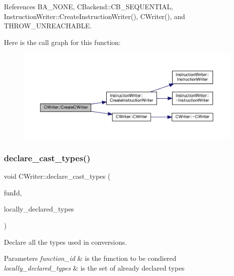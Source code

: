 References B\+A\+\_\+\+N\+O\+NE, C\+Backend\+::\+C\+B\+\_\+\+S\+E\+Q\+U\+E\+N\+T\+I\+AL, Instruction\+Writer\+::\+Create\+Instruction\+Writer(), C\+Writer(), and T\+H\+R\+O\+W\+\_\+\+U\+N\+R\+E\+A\+C\+H\+A\+B\+LE.

Here is the call graph for this function\+:
\nopagebreak
\begin{figure}[H]
\begin{center}
\leavevmode
\includegraphics[width=350pt]{d3/d59/classCWriter_ac5dc8feea1af06fe1d58f10fbe91eaf2_cgraph}
\end{center}
\end{figure}
\mbox{\label{classCWriter_abe7dc69f7739cf009bd2e943a60d1920}} 
\subsubsection{\texorpdfstring{declare\+\_\+cast\+\_\+types()}{declare\_cast\_types()}}
{\footnotesize\ttfamily void C\+Writer\+::declare\+\_\+cast\+\_\+types (\begin{DoxyParamCaption}\item[{unsigned int}]{fun\+Id,  }\item[{\hyperlink{custom__set_8hpp_a615bc2f42fc38a4bb1790d12c759e86f}{Custom\+Set}$<$ std\+::string $>$ \&}]{locally\+\_\+declared\+\_\+types }\end{DoxyParamCaption})\hspace{0.3cm}{\ttfamily [virtual]}}



Declare all the types used in conversions. 


\begin{DoxyParams}{Parameters}
{\em function\+\_\+id} & is the function to be condiered \\
\hline
{\em locally\+\_\+declared\+\_\+types} & is the set of already declared types \\
\hline
\end{DoxyParams}


